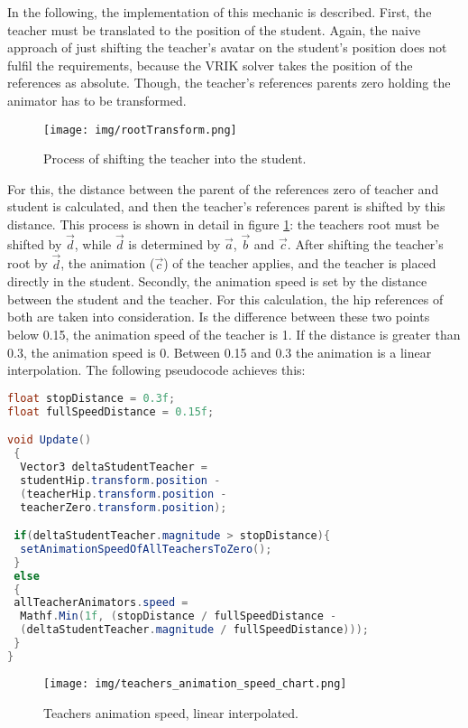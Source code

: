 In the following, the implementation of this mechanic is described. First, the teacher must be translated to the position of the student. Again, the naive approach of just shifting the teacher's avatar on the student's position does not fulfil the requirements, because the VRIK solver takes the position of the references as absolute. Though, the teacher's references parents zero holding the animator has to be transformed.
\begin{figure}
	\centering
	\texttt{[image: img/rootTransform.png]}
	\caption{Process of shifting the teacher into the student.}
	\label{fig:rootRansform}
\end{figure}

For this, the distance between the parent of the references zero of teacher and student is calculated, and then the teacher's references parent is shifted by this distance. This process is shown in detail in figure \ref{fig:rootRansform}: the teachers root must be shifted by $\vec{d}$, while $\vec{d}$ is determined by $\vec{a}$, $\vec{b}$ and $\vec{c}$. After shifting the teacher's root by $\vec{d}$, the animation ($\vec{c}$) of the teacher applies, and the teacher is placed directly in the student. Secondly, the animation speed is set by the distance between the student and the teacher. For this calculation, the hip references of both are taken into consideration. Is the difference between these two points below 0.15, the animation speed of the teacher is 1. If the distance is greater than 0.3, the animation speed is 0. Between 0.15 and 0.3 the animation is a linear interpolation. The following pseudocode achieves this:
\newpage
\begin{lstlisting}[language=JAVA, frame=single]
float stopDistance = 0.3f;
float fullSpeedDistance = 0.15f;

void Update()
 {
  Vector3 deltaStudentTeacher =
  studentHip.transform.position -
  (teacherHip.transform.position -
  teacherZero.transform.position);

 if(deltaStudentTeacher.magnitude > stopDistance){
  setAnimationSpeedOfAllTeachersToZero();
 }
 else
 {
 allTeacherAnimators.speed =
  Mathf.Min(1f, (stopDistance / fullSpeedDistance - 
  (deltaStudentTeacher.magnitude / fullSpeedDistance)));
 }   
}
\end{lstlisting}

\begin{figure}
	\centering
	\texttt{[image: img/teachers\_animation\_speed\_chart.png]}
	\caption{Teachers animation speed, linear interpolated.}
	\label{fig:teachers_animation_speed_chart}
\end{figure}

